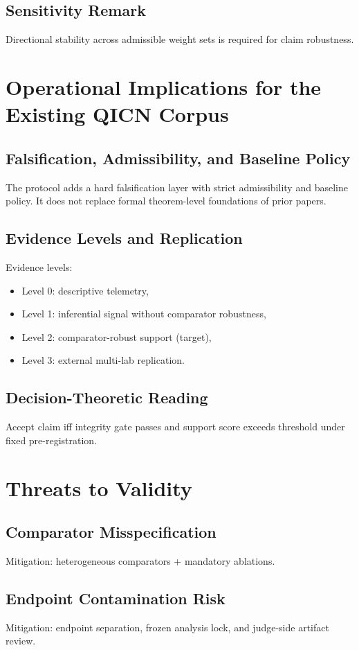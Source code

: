 \documentclass[11pt,a4paper]{article}
\theoremstyle{definition}
\begin{document}
\subsection{Sensitivity Remark}
Directional stability across admissible weight sets is required for claim robustness.

\section{Operational Implications for the Existing QICN Corpus}
\subsection{Falsification, Admissibility, and Baseline Policy}
The protocol adds a hard falsification layer with strict admissibility and baseline policy. It does not replace formal theorem-level foundations of prior papers.

\subsection{Evidence Levels and Replication}
Evidence levels:
\begin{itemize}
\item Level 0: descriptive telemetry,
\item Level 1: inferential signal without comparator robustness,
\item Level 2: comparator-robust support (target),
\item Level 3: external multi-lab replication.
\end{itemize}

\subsection{Decision-Theoretic Reading}
Accept claim iff integrity gate passes and support score exceeds threshold under fixed pre-registration.

\section{Threats to Validity}
\subsection{Comparator Misspecification}
Mitigation: heterogeneous comparators + mandatory ablations.

\subsection{Endpoint Contamination Risk}
Mitigation: endpoint separation, frozen analysis lock, and judge-side artifact review.
\end{document}
